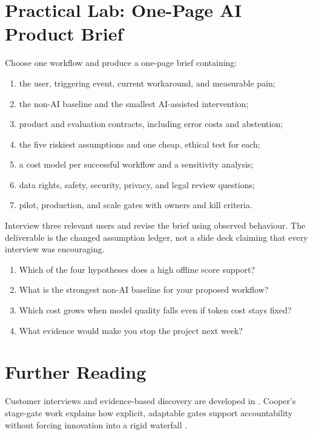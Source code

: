 \section{Practical Lab: One-Page AI Product Brief}

\begin{practicallab}
Choose one workflow and produce a one-page brief containing:
\begin{enumerate}
    \item the user, triggering event, current workaround, and measurable pain;
    \item the non-AI baseline and the smallest AI-assisted intervention;
    \item product and evaluation contracts, including error costs and
          abstention;
    \item the five riskiest assumptions and one cheap, ethical test for each;
    \item a cost model per successful workflow and a sensitivity analysis;
    \item data rights, safety, security, privacy, and legal review questions;
    \item pilot, production, and scale gates with owners and kill criteria.
\end{enumerate}
Interview three relevant users and revise the brief using observed behaviour.
The deliverable is the changed assumption ledger, not a slide deck claiming
that every interview was encouraging.
\end{practicallab}

\begin{checkpoint}
\begin{enumerate}
    \item Which of the four hypotheses does a high offline score support?
    \item What is the strongest non-AI baseline for your proposed workflow?
    \item Which cost grows when model quality falls even if token cost stays
          fixed?
    \item What evidence would make you stop the project next week?
\end{enumerate}
\end{checkpoint}

\section{Further Reading}

Customer interviews and evidence-based discovery are developed in
\cite{constableTalkingHumansSuccess2014}.
Cooper's stage-gate work explains how explicit, adaptable gates support
accountability without forcing innovation into a rigid waterfall
\cite{cooperPerspectiveStageGateIdeatoLaunch2008}.
